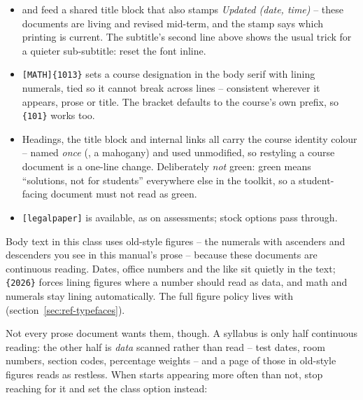 \begin{itemize}
  \item {} and  feed a shared title block that also
    stamps \emph{Updated \textnormal{(date, time)}} -- these documents are
    living and revised mid-term, and the stamp says which printing is
    current. The subtitle's second line above shows the usual trick for a
    quieter sub-subtitle: reset the font inline.
  \item {}\texttt{[MATH]\{1013\}} sets a course designation in the
    body serif with lining numerals, tied so it cannot break across lines --
    consistent wherever it appears, prose or title. The bracket defaults to
    the course's own prefix, so \texttt{\{101\}} works too.
  \item Headings, the title block and internal links all carry the course
    identity colour -- named \emph{once} (, a mahogany)
    and used unmodified, so restyling a course document is a one-line
    change. Deliberately \emph{not} green: green means ``solutions, not for
    students'' everywhere else in the toolkit, so a student-facing document
    must not read as green.
  \item \texttt{[legalpaper]} is available, as on assessments; stock
     options pass through.
\end{itemize}

Body text in this class uses old-style figures -- the numerals with
ascenders and descenders you see in this manual's prose -- because these
documents are continuous reading. Dates, office numbers and the like sit
quietly in the text; \texttt{\{2026\}} forces lining figures
where a number should read as data, and math and  numerals stay
lining automatically. The full figure policy lives with
 (section~\ref{sec:ref-typefaces}).

Not every prose document wants them, though. A syllabus is only half
continuous reading: the other half is \emph{data} scanned rather than
read -- test dates, room numbers, section codes, percentage weights --
and a page of those in old-style figures reads as restless. When
 starts appearing more often than not, stop reaching for
it and set the class option instead:


